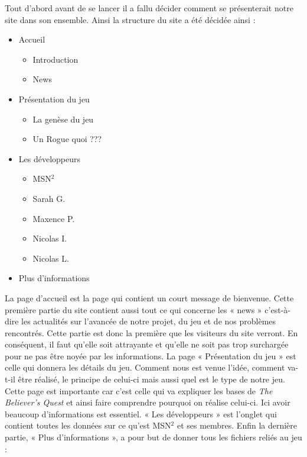 \documentclass[]{extarticle}
\begin{document}
\begin{spacing}{1.25}
\bigbreak
\bigbreak
Tout d’abord avant de se lancer il a fallu décider comment se présenterait notre site dans son ensemble. Ainsi la structure du site a été décidée ainsi :
\bigbreak
\begin{itemize}
\item Accueil
\begin{itemize}
\item Introduction
\item News
\end{itemize}
\bigbreak
\item Présentation du jeu
\begin{itemize}
\item La genèse du jeu
\item Un Rogue quoi ???
\end{itemize}
\bigbreak
\item Les développeurs
\begin{itemize}
\item MSN$^2$
\item Sarah G.
\item Maxence P.
\item Nicolas I.
\item Nicolas L.
\end{itemize}
\bigbreak
\item Plus d'informations
\end{itemize}
\bigbreak
\bigbreak
La page d’accueil est la page qui contient un court message de bienvenue. Cette première partie du site contient aussi tout ce qui concerne les « news » c’est-à-dire les actualités sur l’avancée de notre projet, du jeu et de nos problèmes rencontrés. Cette partie est donc la première que les visiteurs du site verront. En conséquent, il faut qu'elle soit attrayante et qu’elle ne soit pas trop surchargée pour ne pas être noyée par les informations.
\bigbreak
La page « Présentation du jeu » est celle qui donnera les détails du jeu. Comment nous est venue l'idée, comment va-t-il être réalisé, le principe de celui-ci mais aussi quel est le type de notre jeu. Cette page est importante car c’est celle qui va expliquer les bases de \textit{The Believer's Quest} et ainsi faire comprendre pourquoi on réalise celui-ci. Ici avoir beaucoup d’informations est essentiel.
\bigbreak
« Les développeurs » est l’onglet qui contient toutes les données sur ce qu’est MSN$^2$ et ses membres.
\newpage
Enfin la dernière partie, « Plus d'informations », a pour but de donner tous les fichiers reliés au jeu :
\bigbreak
\begin{itemize}

\end{itemize}
\end{spacing}
\end{document}
